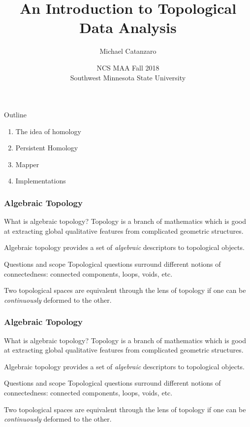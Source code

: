 \documentclass[usenames,dvipsnames,aspectratio=1610]{beamer}
\title{An Introduction to Topological Data Analysis}
\author{Michael Catanzaro}
\date{NCS MAA Fall 2018 \\ Southwest Minnesota State University}
\institute{Iowa State University}
\begin{document}
\begin{frame}[plain]
  \maketitle
\end{frame}


\begin{frame}{Outline}
  \begin{enumerate}
    \item The idea of homology
    \item Persistent Homology
    \item Mapper
    \item Implementations
  \end{enumerate}
\end{frame}

\begin{frame}
  \frametitle{Algebraic Topology}
  \begin{block}{What is algebraic topology?}
    Topology is a branch of mathematics which is good at extracting global
    qualitative features from complicated geometric structures. 
    
    Algebraic topology provides a set of {\em algebraic} descriptors to topological objects.
  \end{block}
  \pause

  \begin{block}{Questions and scope}
    Topological questions surround different notions of connectedness:
    connected components, loops, voids, etc.

    Two topological spaces are equivalent through the lens of topology if one
    can be {\em continuously} deformed to the other. 
  \end{block}
\end{frame}

\begin{frame}
  \frametitle{Algebraic Topology}
  \begin{block}{What is algebraic topology?}
    Topology is a branch of mathematics which is good at extracting global
    qualitative features from complicated geometric structures. 
    
    Algebraic topology provides a set of {\em algebraic} descriptors to topological objects.
  \end{block}

  \begin{block}{Questions and scope}
    Topological questions surround different notions of connectedness:
    connected components, loops, voids, etc.

    Two topological spaces are equivalent through the lens of topology if one
    can be {\em continuously} deformed to the other. 
  \end{block}
\end{frame}
\end{document}
